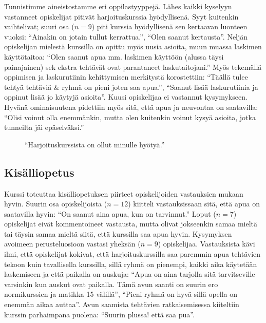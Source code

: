 Tunnistimme aineistostamme eri oppilastyyppejä.
Lähes kaikki kyselyyn vastanneet opiskelijat pitivät harjoituskurssia hyödyllisenä.
Syyt kuitenkin vaihtelivat; suuri osa ($n=9$) piti kurssia hyödyllisenä sen kertaavan luonteen vuoksi: ``Ainakin on jotain tullut kerrattua.'', ``Olen saanut kertausta''.
Neljän opiskelijan mielestä kurssilla on opittu myös uusia asioita, muun muassa laskimen käyttötaitoa: ``Olen saanut apua mm. laskimen käyttöön (alussa täysi painajainen) sek ekstra tehtävät ovat parantaneet laskutaitojani.''
Myös tekemällä oppimisen ja laskurutiinin kehittymisen merkitystä korostettiin: ``Täällä tulee tehtyä tehtäviä \& ryhmä on pieni joten saa apua.'', ``Saanut lisää laskurutiinia ja oppinut lisää jo käytyjä asioita''. 
Kuusi opiskelijaa ei vastannut kysymykseen.
Hyvänä ominaisuutena pidettiin myös sitä, että apua ja neuvontaa on saatavilla: ``Olisi voinut olla enemmänkin, mutta olen kuitenkin voinut kysyä asioita, jotka tunneilta jäi epäselväksi.''

\begin{figure}[h!]
\centering
{}
\caption{``Harjoituskurssista on ollut minulle hyötyä.''}
\end{figure}

\subsection{Kisälliopetus}
Kurssi toteuttaa kisälliopetuksen piirteet opiskelijoiden vastauksien mukaan hyvin.
Suurin osa opiskelijoista ($n=12$) kiitteli vastauksissaan sitä, että apua on saatavilla hyvin: ``On saanut aina apua, kun on tarvinnut.''
Loput ($n=7$) opiskelijat eivät kommentoineet vastausta, mutta olivat jokseenkin samaa mieltä tai täysin samaa mieltä siitä, että kurssilla saa apua hyvin.
Kysymyksen avoimeen perusteluosioon vastasi yheksän ($n=9$) opiskelijaa. Vastauksista kävi ilmi, että opiskelijat kokivat, että harjoituskurssilla saa paremmin apua tehtävien tekoon kuin tavallisella kurssilla, sillä ryhmä on pienempi, kaikki aika käytetään laskemiseen ja että paikalla on auskuja: ``Apua on aina tarjolla sitä tarvitseville varsinkin kun auskut ovat paikalla. Tämä avun saanti on suurin ero normikurssien ja matikka 15 välillä'', ``Pieni ryhmä on hyvä sillä opella on enemmän aikaa auttaa''.  Avun saamista tehtävien ratkaisemisessa kiiteltiin kurssin parhaimpana puolena: ``Suurin plussa! että saa pua''. 

